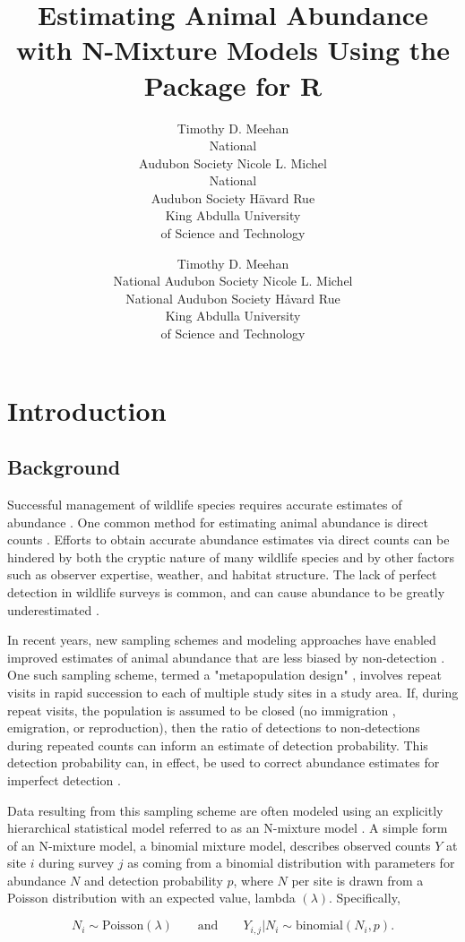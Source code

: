 \documentclass[article]{jss}
\author{Timothy D. Meehan\\National\\Audubon Society \And
        Nicole L. Michel\\National\\Audubon Society \And
        H\"{a}vard Rue\\King Abdulla University\\of Science and Technology}
\author{Timothy D. Meehan\\National Audubon Society \And
        Nicole L. Michel\\National Audubon Society \And
        H{\aa}vard Rue\\King Abdulla University\\of Science and Technology}
\title{Estimating Animal Abundance with N-Mixture Models Using the \pkg{R-INLA} Package for R}
\begin{document}
\section[Introduction]{Introduction}
\subsection[Background]{Background}
Successful management of wildlife species requires accurate estimates of abundance \citep{Yoccoz_Nichols_Boulinier_2001}.  One common method for estimating animal abundance is direct counts \citep{Pollock_Nichols_Simons_Farnsworth_Bailey_Sauer_2002}.  Efforts to obtain accurate abundance estimates via direct counts can be hindered by both the cryptic nature of many wildlife species and by other factors such as observer expertise, weather, and habitat structure.  The lack of perfect detection in wildlife surveys is common, and can cause abundance to be greatly underestimated \citep{Wenger_Freeman_2008, Joseph_Elkin_Martin_Possingham_2009}.

In recent years, new sampling schemes and modeling approaches have enabled improved estimates of animal abundance that are less biased by non-detection \citep{Denes_Silveira_Beissinger_2015}.  One such sampling scheme, termed a "metapopulation design" \citep{Kery_Royle_2010}, involves repeat visits in rapid succession to each of multiple study sites in a study area.  If, during repeat visits, the population is assumed to be closed (no immigration , emigration, or reproduction), then the ratio of detections to non-detections during repeated counts can inform an estimate of detection probability.  This detection probability can, in effect, be used to correct abundance estimates for imperfect detection \citep{Denes_Silveira_Beissinger_2015}.

Data resulting from this sampling scheme are often modeled using an explicitly hierarchical statistical model referred to as an N-mixture model \citep{Royle_Nichols_2003, Dodd_Dorazio_2004, Royle_2004, Kery_Royle_Schmid_2005}.  A simple form of an N-mixture model, a binomial mixture model, describes observed counts $Y$ at site $i$ during survey $j$ as coming from a binomial distribution with parameters for abundance $N$ and detection probability $p$, where $N$ per site is drawn from a Poisson distribution with an expected value, lambda $(\lambda)$. Specifically,

$$N_i \sim \text{Poisson}(\lambda) \qquad \text{and} \qquad  Y_{i,j} | N_i \sim \text{binomial}(N_i, p).$$
\end{document}
